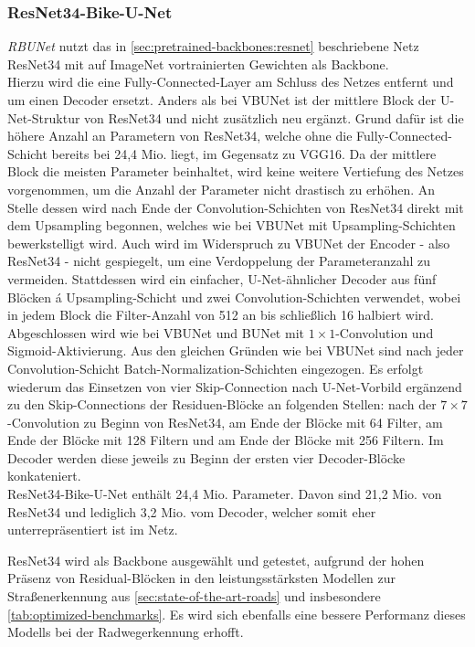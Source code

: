 \subsubsection{ResNet34-Bike-U-Net}

\textit{\ac{RBUNet}} nutzt das in \autoref{sec:pretrained-backbones:resnet} beschriebene Netz ResNet34 
mit auf ImageNet vortrainierten Gewichten als Backbone. \\
Hierzu wird die eine Fully-Connected-Layer am Schluss des Netzes entfernt und um einen Decoder ersetzt. 
Anders als bei \ac{VBUNet} ist der mittlere Block der U-Net-Struktur von ResNet34 
und nicht zusätzlich neu ergänzt. Grund dafür ist die höhere Anzahl an Parametern 
von ResNet34, welche ohne die Fully-Connected-Schicht bereits bei 24,4 Mio. liegt, im Gegensatz zu VGG16. 
Da der mittlere Block die meisten Parameter beinhaltet, wird keine weitere Vertiefung des Netzes vorgenommen,
um die Anzahl der Parameter nicht drastisch zu erhöhen. An Stelle dessen wird nach Ende der Convolution-Schichten von 
ResNet34 direkt mit dem Upsampling begonnen, welches wie bei \ac{VBUNet} mit Upsampling-Schichten 
bewerkstelligt wird. Auch wird im Widerspruch zu \ac{VBUNet} der Encoder - also ResNet34 - nicht gespiegelt, 
um eine Verdoppelung der Parameteranzahl zu vermeiden. Stattdessen wird ein einfacher, U-Net-ähnlicher Decoder
aus fünf Blöcken á Upsampling-Schicht und zwei Convolution-Schichten verwendet, wobei in jedem Block 
die Filter-Anzahl von 512 an bis schließlich 16 halbiert wird. Abgeschlossen wird wie bei \ac{VBUNet} und
\ac{BUNet} mit $1\times 1$-Convolution und Sigmoid-Aktivierung. Aus den gleichen Gründen wie bei \ac{VBUNet}
sind nach jeder Convolution-Schicht Batch-Normalization-Schichten eingezogen. 
Es erfolgt wiederum das Einsetzen von vier Skip-Connection nach U-Net-Vorbild ergänzend zu den 
Skip-Connections der Residuen-Blöcke an folgenden Stellen: 
nach der $7\times 7$-Convolution zu Beginn von ResNet34, 
am Ende der Blöcke mit 64 Filter, am Ende der Blöcke mit 128 Filtern 
und am Ende der Blöcke mit 256 Filtern. Im Decoder werden diese jeweils 
zu Beginn der ersten vier Decoder-Blöcke konkateniert. \\ 
ResNet34-Bike-U-Net enthält 24,4 Mio. Parameter. Davon sind 21,2 Mio. von ResNet34 und lediglich 3,2 Mio. 
vom Decoder, welcher somit eher unterrepräsentiert ist im Netz.  

ResNet34 wird als Backbone ausgewählt und getestet, aufgrund der hohen Präsenz von 
Residual-Blöcken in den leistungsstärksten Modellen 
zur Straßenerkennung aus \autoref{sec:state-of-the-art-roads} und insbesondere \autoref{tab:optimized-benchmarks}.
Es wird sich ebenfalls eine bessere Performanz dieses Modells bei der Radwegerkennung erhofft. 

